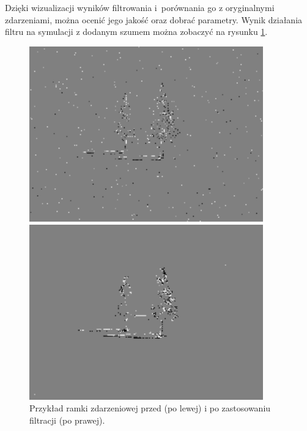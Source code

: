 
Dzięki wizualizacji wyników filtrowania i~porównania go z oryginalnymi zdarzeniami, można ocenić jego jakość oraz dobrać parametry. Wynik działania filtru na symulacji z dodanym szumem można zobaczyć na rysunku \ref{fig:filter_example}.

\begin{figure}
    \centering
    \begin{minipage}{0.5\textwidth}
        \centering
        \includegraphics[width = 0.9\textwidth]{images/unfiltered_example.png}
    \end{minipage}\hfill
    \begin{minipage}{0.5\textwidth}
        \centering
        \includegraphics[width = 0.9\textwidth]{images/filtered_example.png}
    \end{minipage}
    \caption{Przykład ramki zdarzeniowej przed (po lewej) i po zastosowaniu filtracji (po prawej).}
    \label{fig:filter_example}
\end{figure}




